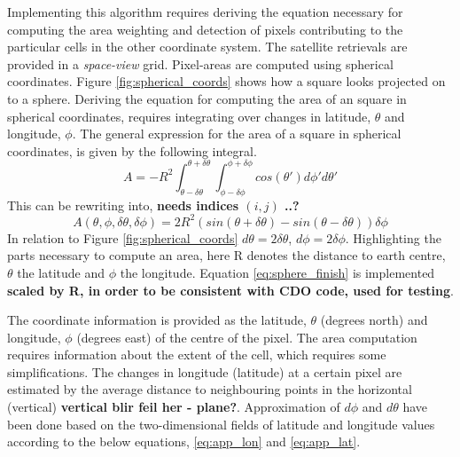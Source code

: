 Implementing this algorithm requires deriving the equation necessary for computing the area weighting and detection of pixels contributing to the particular cells in the other coordinate system. The satellite retrievals are provided in a \textit{space-view} grid. Pixel-areas are computed using spherical coordinates. Figure \ref{fig:spherical_coords} shows how a square looks projected on to a sphere. Deriving the equation for computing the area of an square in spherical coordinates, requires integrating over changes in latitude, $\theta$ and longitude, $\phi$. The general expression for the area of a square in spherical coordinates, is given by the following integral. 
\begin{equation} \label{eq:sphere_integral}
    A = -R^2\int_{ \theta - \delta \theta }^{\theta + \delta \theta} \int_{ \phi - \delta \phi }^{\phi + \delta \phi} cos\left( \theta' \right) d\phi' d\theta'
\end{equation}
This can be rewriting into, \textbf{needs indices $(i, j)$ ..?}
\begin{equation} \label{eq:sphere_finish}
    A \left( \theta, \phi, \delta \theta, \delta \phi   \right)= 2R^2 \left( sin\left( \theta + \delta \theta  \right) - sin\left(  \theta - \delta \theta  \right) \right) \delta \phi
\end{equation}
In relation to Figure \ref{fig:spherical_coords} $d \theta = 2 \delta \theta$, $d \phi = 2 \delta \phi$. Highlighting the parts necessary to compute an area, here R denotes the distance to earth centre, $\theta$ the latitude and $\phi$ the longitude. Equation \ref{eq:sphere_finish} is implemented \textbf{scaled by R, in order to be consistent with CDO code, used for testing}. 

The coordinate information is provided as the latitude, $\theta$ (degrees north) and longitude, $\phi$ (degrees east) of the centre of the pixel. The area computation requires information about the extent of the cell, which requires some simplifications. The changes in longitude (latitude) at a certain pixel are estimated by the average distance to neighbouring points in the horizontal (vertical) \textbf{vertical blir feil her - plane?}. Approximation of $d\phi$ and $d\theta$ have been done based on the two-dimensional fields of latitude and longitude values according to the below equations, \eqref{eq:app_lon} and  \eqref{eq:app_lat}. 

